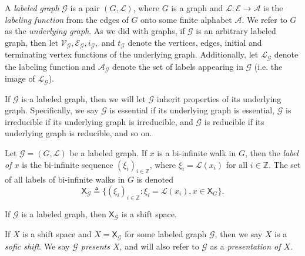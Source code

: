 \documentclass[hidelinks]{article}
\newcommand{\Ac}{\mathcal{A}}  %
\newcommand{\Lc}{\mathcal{L}}  %
\newcommand{\Gc}{\mathcal{G}}  %
\newcommand{\Vc}{\mathcal{V}}
\newcommand{\Ec}{\mathcal{E}}
\newcommand{\Bc}{\mathcal{B}}
\newcommand{\shift}[1]{\mathsf{X}_{#1}}
\newcommand{\term}[1]{\textit{#1}}
\theoremstyle{definition}
\begin{document}
\begin{definition}
    A \term{labeled graph} \(\Gc\) is a pair \((G, \Lc)\), where \(G\) is a graph and \(\Lc : \Ec \to \Ac\) is the 
    \term{labeling function} from the edges of \(G\) onto some finite alphabet \(\Ac\). We 
    refer to \(G\) as the \term{underlying graph}.
    As we did with graphs, if \(\Gc\) is an arbitrary labeled graph, then 
    let \(\Vc_\Gc, \Ec_\Gc, i_\Gc,\) and \(t_\Gc\) denote the vertices, edges, 
    initial and terminating vertex functions of the underlying graph. Additionally,
    let \(\Lc_\Gc\) denote the labeling function and \(\Ac_\Gc\) denote the set 
    of labels appearing in \(\Gc\) (i.e. the image of \(\Lc_\Gc\)).

\end{definition}

If \(\Gc\) is a labeled graph, then we will let \(\Gc\) inherit properties of its underlying 
graph. Specifically, we say \(\Gc\) is essential if its underlying graph is essential, 
\(\Gc\) is irreducible if its underlying graph is irreducible, and \(\Gc\) is reducible 
if its underlying graph is reducible, and so on. 

\begin{definition}
    Let \(\Gc = (G, \Lc)\) be a labeled graph. If \(x\) is a bi-infinite walk in \(G\), 
    then the \term{label of \(x\)} is the bi-infinite sequence \((\xi_i)_{i \in \mathbb{Z}}\), 
    where \(\xi_i = \Lc(x_i)\) for all \(i \in \mathbb{Z}\). The set of all labels of 
    bi-infinite walks in \(G\) is denoted
    \[\shift{\Gc} \triangleq \big\{ (\xi_i)_{i \in \mathbb{Z}} : \xi_i = \Lc(x_i), x \in \shift{G} \big\}. \]
\end{definition}

\begin{theorem}[name=\cite{lind1995introduction}]
    If \(\Gc\) is a labeled graph, then \(\shift{\Gc}\) is a shift space.
\end{theorem}

If \(X\) is a shift space and \(X = \shift{\Gc}\) for some labeled graph \(\Gc\), 
then we say \(X\) is a \term{sofic shift}. We say \term{\(\Gc\) presents \(X\)}, 
and will also refer to \(\Gc\) as a \term{presentation of \(X\)}. 
\end{document}
